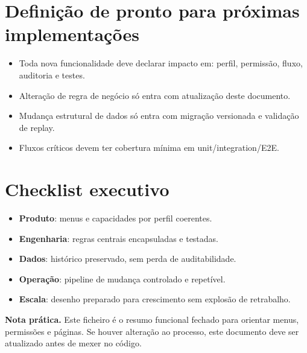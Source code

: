 \documentclass[11pt,a4paper]{article}
\begin{document}
\section{Definição de pronto para próximas implementações}
\begin{itemize}
  \item Toda nova funcionalidade deve declarar impacto em: perfil, permissão, fluxo, auditoria e testes.
  \item Alteração de regra de negócio só entra com atualização deste documento.
  \item Mudança estrutural de dados só entra com migração versionada e validação de replay.
  \item Fluxos críticos devem ter cobertura mínima em unit/integration/E2E.
\end{itemize}

\section{Checklist executivo}
\begin{itemize}
  \item \textbf{Produto}: menus e capacidades por perfil coerentes.
  \item \textbf{Engenharia}: regras centrais encapsuladas e testadas.
  \item \textbf{Dados}: histórico preservado, sem perda de auditabilidade.
  \item \textbf{Operação}: pipeline de mudança controlado e repetível.
  \item \textbf{Escala}: desenho preparado para crescimento sem explosão de retrabalho.
\end{itemize}

\vspace{0.5em}
\noindent\colorbox{softblue}{\parbox{\dimexpr\linewidth-2\fboxsep\relax}{
\textbf{Nota prática.} Este ficheiro é o resumo funcional fechado para orientar menus, permissões e páginas. Se houver alteração ao processo, este documento deve ser atualizado antes de mexer no código.
}}
\end{document}
